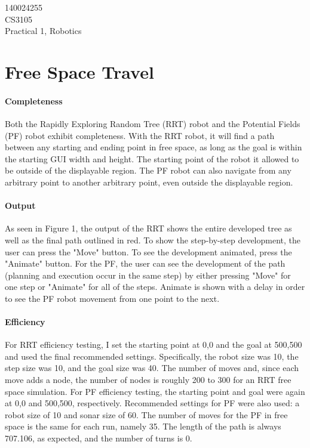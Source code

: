 \documentclass[12pt]{article}
\begin{document}
\begin{flushright}
140024255\\
CS3105\\
Practical 1, Robotics
\end{flushright}

\section{Free Space Travel}
\paragraph*{Completeness}
Both the Rapidly Exploring Random Tree (RRT) robot and the Potential Fields (PF) robot exhibit completeness. With the RRT robot, it will find a path between any starting and ending point in free space, as long as the goal is within the starting GUI width and height. The starting point of the robot it allowed to be outside of the displayable region. The PF robot can also navigate from any arbitrary point to another arbitrary point, even outside the displayable region.

\paragraph*{Output}
As seen in Figure 1, the output of the RRT shows the entire developed tree as well as the final path outlined in red. To show the step-by-step development, the user can press the "Move" button. To see the development animated, press the "Animate" button. For the PF, the user can see the development of the path (planning and execution occur in the same step) by either pressing "Move" for one step or "Animate" for all of the steps. Animate is shown with a delay in order to see the PF robot movement from one point to the next.
\paragraph*{Efficiency}
For RRT efficiency testing, I set the starting point at 0,0 and the goal at 500,500 and used the final recommended settings. Specifically, the robot size was 10, the step size was 10, and the goal size was 40.
The number of moves and, since each move adds a node, the number of nodes is roughly 200 to 300 for an RRT free space simulation. %
For PF efficiency testing, the starting point and goal were again at 0,0 and 500,500, respectively. Recommended settings for PF were also used: a robot size of 10 and sonar size of 60.
The number of moves for the PF in free space is the same for each run, namely 35. The length of the path is always 707.106, as expected, and the number of turns is 0.
\end{document}
